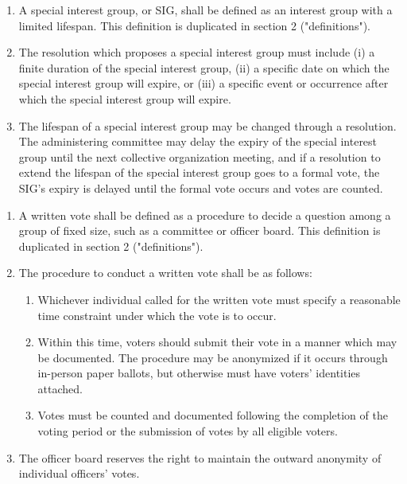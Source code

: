\documentclass[11pt]{article}
\newcounter{h1}
\newcounter{h2}[h1]
\newcounter{h3}[h2]
\begin{document}

\begin{enumerate}
  \item A special interest group, or SIG, shall be defined as an interest group with a limited lifespan. This definition is duplicated in section 2 ("definitions").  
  \item The resolution which proposes a special interest group must include (i) a finite duration of the special interest group, (ii) a specific date on which the special interest group will expire, or (iii) a specific event or occurrence after which the special interest group will expire.  
  \item The lifespan of a special interest group may be changed through a resolution. The administering committee may delay the expiry of the special interest group until the next collective organization meeting, and if a resolution to extend the lifespan of the special interest group goes to a formal vote, the SIG's expiry is delayed until the formal vote occurs and votes are counted.
\end{enumerate}



\begin{enumerate}
  \item A written vote shall be defined as a procedure to decide a question among a group of fixed size, such as a committee or officer board. This definition is duplicated in section 2 ("definitions").  
  \item The procedure to conduct a written vote shall be as follows:  
  \begin{enumerate}
    \item Whichever individual called for the written vote must specify a reasonable time constraint under which the vote is to occur.  
    \item Within this time, voters should submit their vote in a manner which may be documented. The procedure may be anonymized if it occurs through in-person paper ballots, but otherwise must have voters' identities attached.  
    \item Votes must be counted and documented following the completion of the voting period or the submission of votes by all eligible voters.  
  \end{enumerate}
  \item The officer board reserves the right to maintain the outward anonymity of individual officers' votes.
\end{enumerate}
\end{document}
